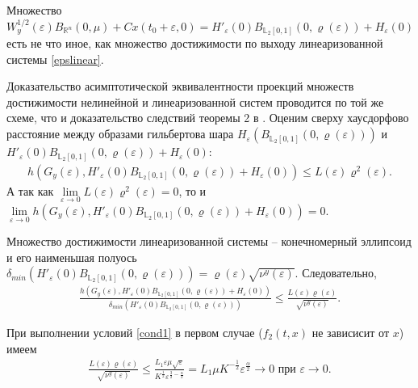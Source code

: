 \documentclass[../main.tex]{subfiles}
\begin{document}
	Множество $ W_y^{1/2}(\varepsilon)B_{\mathbb{R}^n}(0,\mu) + Cx(t_0+\varepsilon,0)  = H'_{\varepsilon}(0)B_{\mathbb{L}_2[0,1]}(0,\varrho(\varepsilon))+ H_{\varepsilon}(0)$ есть не что иное, как множество достижимости по выходу линеаризованной системы \eqref{epslinear}.
	
	Доказательство асимптотической эквивалентности проекций множеств достижимости нелинейной и линеаризованной систем проводится по той же схеме, что и доказательство следствий теоремы 2 в \cite{GusevUMJ}. Оценим сверху хаусдорфово расстояние между образами гильбертова шара $ H_{\varepsilon}\left( B_{\mathbb{L}_2[0,1]}(0,\varrho(\varepsilon))\right)  $ и $ H'_{\varepsilon}(0)B_{\mathbb{L}_2[0,1]}(0,\varrho(\varepsilon))+ H_{\varepsilon}(0) $:
	\begin{gather*}
		h\left( G_y(\varepsilon), H'_{\varepsilon}(0)B_{\mathbb{L}_2[0,1]}(0,\varrho(\varepsilon))+ H_{\varepsilon}(0)\right)  \leqslant L(\varepsilon) \varrho^2(\varepsilon).
	\end{gather*}
	А так как $ \lim\limits_{\varepsilon \rightarrow 0}  L(\varepsilon) \varrho^2(\varepsilon) = 0 $, то и $ \lim\limits_{\varepsilon \rightarrow 0} h\left( G_y(\varepsilon), H'_{\varepsilon}(0)B_{\mathbb{L}_2[0,1]}(0,\varrho(\varepsilon))+ H_{\varepsilon}(0)\right)  = 0 $.
	
	
	Множество достижимости линеаризованной системы -- конечномерный эллипсоид и его наименьшая полуось $ \delta_{min}\left(H'_{\varepsilon}(0)B_{\mathbb{L}_2[0,1]}(0,\varrho(\varepsilon)) \right)=\varrho(\varepsilon)\sqrt{\nu^y(\varepsilon)} $. 
	Следовательно,
	\begin{gather*}
		\frac{h\left(G_y(\varepsilon), H'_{\varepsilon}(0)B_{\mathbb{L}_2[0,1]}(0,\varrho(\varepsilon))+ H_{\varepsilon}(0)\right) }{\delta_{min}\left( H'_{\varepsilon}(0)B_{\mathbb{L}_2[0,1]}(0,\varrho(\varepsilon))\right) } \leqslant \frac{L(\varepsilon) \varrho(\varepsilon)}{\sqrt{\nu^y(\varepsilon)}}.
	\end{gather*}
	
	При выполнении условий \eqref{cond1} в первом случае ($ f_2(t,x) $ не зависисит от $ x $) имеем
	\begin{gather*}
		\frac{L(\varepsilon) \varrho(\varepsilon)}{\sqrt{\nu^y(\varepsilon)}} 
		\leqslant
		\frac{L_1\varepsilon\mu\sqrt{\varepsilon}}{K^{\frac{1}{2}}\varepsilon^{\frac{3}{2}-\frac{\alpha}{2}}} 
		=
		L_1\mu K^{-\frac{1}{2}}\varepsilon^{\frac{\alpha}{2}} \rightarrow 0 \mbox{\ при\ } \varepsilon \rightarrow 0.
	\end{gather*}
	
\end{document}
